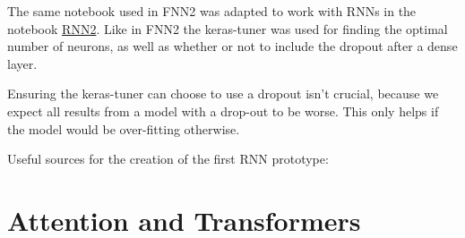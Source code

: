 \documentclass{article}
\begin{document}
The same notebook used in FNN2 was adapted to work with RNNs in the notebook 
\href{https://github.com/AntonStantan/matura/blob/main/RNN/RNN2.ipynb}{RNN2}. 
Like in FNN2 the keras-tuner was used for finding the optimal number of 
neurons, as well as whether or not to include the dropout after a dense 
layer.

Ensuring the keras-tuner can choose to use a dropout isn't crucial, because 
we expect all results from a model with a drop-out to be worse. This only 
helps if the model would be over-fitting otherwise.


Useful sources for the creation of the first RNN prototype:
\cite{bowman2015recursiveneuralnetworkslearn, tensorflow_keras_rnn,ibm_rnn}


\section{Attention and Transformers}


\newpage
\printbibliography[heading=bibintoc]
\end{document}
